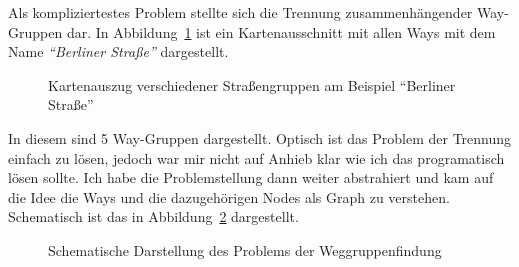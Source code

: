 Als kompliziertestes Problem stellte sich die Trennung zusammenhängender Way-Gruppen dar.
In Abbildung~\ref{fig:ose:osm_streetgroups_1} ist ein Kartenausschnitt mit allen Ways mit dem Name \textit{``Berliner Straße''} dargestellt.
\begin{figure}[htb]
   \centering
   \caption{Kartenauszug verschiedener Straßengruppen am Beispiel ``Berliner Straße''}
   \label{fig:ose:osm_streetgroups_1}
 \end{figure}
In diesem sind 5 Way-Gruppen dargestellt.
Optisch ist das Problem der Trennung einfach zu lösen, jedoch war mir nicht auf Anhieb klar wie ich das programatisch lösen sollte.
Ich habe die Problemstellung dann weiter abstrahiert und kam auf die Idee die Ways und die dazugehörigen Nodes als Graph zu verstehen. Schematisch ist das in Abbildung~\ref{fig:ose:osm_streetgroups_2} dargestellt.

\begin{figure}[htb]
   \centering
   \caption{Schematische Darstellung des Problems der Weggruppenfindung}
   \label{fig:ose:osm_streetgroups_2}
 \end{figure}

